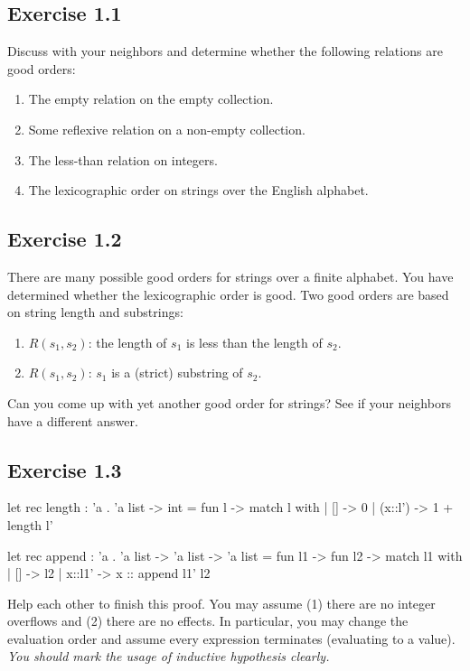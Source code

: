 \documentclass[fleqn]{article}
\begin{document}
\subsection*{Exercise 1.1}

Discuss with your neighbors and determine whether the following
relations are good orders:

\begin{enumerate}
\item
  The empty relation on the empty collection.
\item
  Some reflexive relation on a non-empty collection.
\item
  The less-than relation on integers.
\item
  The lexicographic order on strings over the English alphabet.
\end{enumerate}

\subsection*{Exercise 1.2}

There are many possible good orders for strings over a finite alphabet.
You have determined whether the lexicographic order is good. Two good
orders are based on string length and substrings:

\begin{enumerate}
\item
  $R(s_1,s_2)$: the length of $s_1$ is less than the length of $s_2$.
\item
  $R(s_1,s_2)$: $s_1$ is a (strict) substring of $s_2$.
\end{enumerate}

Can you come up with yet another good order for strings? See if your neighbors have a different answer.

\subsection*{Exercise 1.3}

\begin{ocamlcode}
let rec length : 'a . 'a list -> int
  = fun l ->
    match l with
    | [] -> 0
    | (x::l') -> 1 + length l'

let rec append : 'a . 'a list -> 'a list -> 'a list
  = fun l1 -> fun l2 ->
    match l1 with
    | [] -> l2
    | x::l1' -> x :: append l1' l2
\end{ocamlcode}

Help each other to finish this proof. You may assume (1) there are no integer overflows and (2) there are no effects. In particular, you may change the evaluation order and assume every expression terminates (evaluating to a value). \emph{You should mark the usage of inductive hypothesis clearly.}
\end{document}
